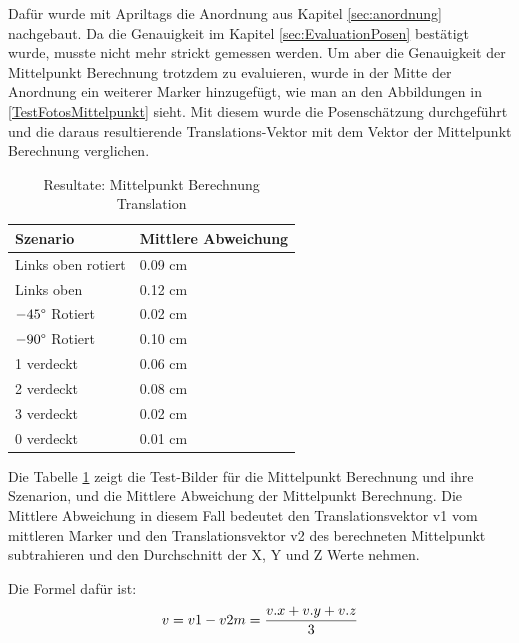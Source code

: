 Dafür wurde mit Apriltags die Anordnung aus Kapitel \ref{sec:anordnung} nachgebaut. 
Da die Genauigkeit im Kapitel \ref{sec:EvaluationPosen} bestätigt wurde, musste nicht mehr strickt gemessen werden.
Um aber die Genauigkeit der Mittelpunkt Berechnung trotzdem zu evaluieren, wurde in der Mitte der Anordnung ein weiterer Marker hinzugefügt, wie man an den Abbildungen in \ref{TestFotosMittelpunkt} sieht.
Mit diesem wurde die Posenschätzung durchgeführt und die daraus resultierende Translations-Vektor mit dem Vektor der Mittelpunkt Berechnung verglichen.

\begin{table}[!htb]
    \caption{Resultate: Mittelpunkt Berechnung Translation}
    \label{tab:MittelpunktTranslation}
        \begin{tabular}{|l|l|}
            \hline
            Szenario &  Mittlere Abweichung\\
            \hline
            Links oben rotiert & 0.09 cm\\
            \hline
            Links oben & 0.12 cm\\
            \hline
            \(-45 \degree\) Rotiert & 0.02 cm\\
            \hline
            \(-90 \degree\) Rotiert& 0.10 cm\\
            \hline
            1 verdeckt & 0.06 cm\\
            \hline
            2 verdeckt & 0.08 cm\\
            \hline
            3 verdeckt & 0.02 cm\\
            \hline
            0 verdeckt & 0.01 cm\\
            \hline
        \end{tabular}
\end{table}

Die Tabelle \ref{tab:MittelpunktTranslation} zeigt die Test-Bilder für die Mittelpunkt Berechnung und ihre Szenarion, und die Mittlere Abweichung der Mittelpunkt Berechnung.
Die Mittlere Abweichung in diesem Fall bedeutet den Translationsvektor v1 vom mittleren Marker und den Translationsvektor v2 des berechneten Mittelpunkt subtrahieren und den Durchschnitt der X, Y und Z Werte nehmen. 

Die Formel dafür ist: 
\begin{equation}
    v = v1 - v2\\
    m = \frac{v.x + v.y + v.z}{3}
    \label{eq:mittlereAbweichung}
\end{equation}

